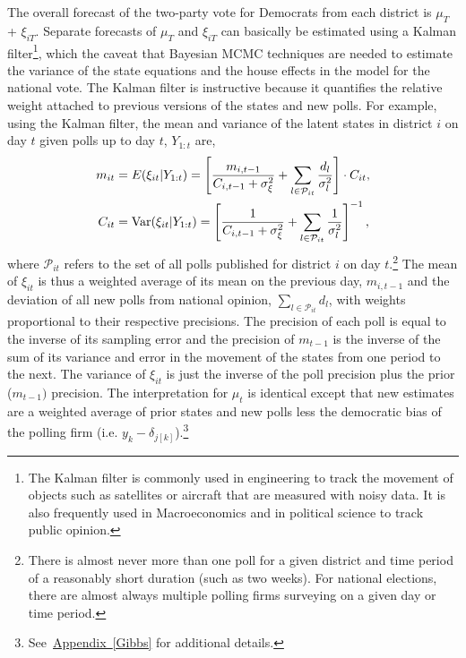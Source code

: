 \documentclass[12pt,final,fleqn]{article}
\newcommand{\aref}[1]{\hyperref[#1]{Appendix~\ref{#1}}}
\theoremstyle{plain}
\newcommand\var{{\rm Var}}
\begin{document}
The overall forecast of the two-party vote for Democrats from each district is $\mu_T$ + $\xi_{iT}$. Separate forecasts of $\mu_T$ and $\xi_{iT}$ can basically be estimated using a Kalman filter\footnote{The Kalman filter is commonly used in engineering to track the movement of objects such as satellites or aircraft that are measured with noisy data. It is also frequently used in Macroeconomics and in political science to track public opinion.}, which the caveat that Bayesian MCMC techniques are needed to estimate the variance of the state equations and the house effects in the model for the national vote. The Kalman filter is instructive because it quantifies the relative weight attached to previous versions of the states and new polls. For example, using the Kalman filter, the mean and variance of the latent states in district $i$ on day $t$ given polls up to day $t$, $Y_{1:t}$ are,
\begin{align}
m_{it} &= E(\xi_{it}|Y_{1:t})= \left[\frac{m_{i,t-1}}{C_{i,t-1} + \sigma_\xi^2} + \sum_{l \in \mathcal{P}_{it}} \frac{d_{l}}{\sigma^2_l}\right]\cdot C_{it},\\
C_{it} &= \var(\xi_{it}|Y_{1:t})= \left[\frac{1}{C_{i,t-1} + \sigma_\xi^2}+ \sum_{l \in \mathcal{P}_{it}}\frac{1}{\sigma^2_{l}}\right]^{-1},
\end{align}
where $\mathcal{P}_{it}$ refers to the set of all polls published for district $i$ on day $t$.\footnote{There is almost never more than one poll for a given district and time period of a reasonably short duration (such as two weeks). For national elections, there are almost always multiple polling firms surveying on a given day or time period.}
The mean of $\xi_{it}$ is thus a weighted average of its mean on the previous day, $m_{i,t-1}$ and the deviation of all new polls from national opinion, $\sum_{l \in \mathcal{P}_{it}} d_{l}$, with weights proportional to their respective precisions. The precision of each poll is equal to the inverse of its sampling error and the precision of $m_{t-1}$ is the inverse of the sum of its variance and error in the movement of the states from one period to the next. The variance of $\xi_{it}$ is just the inverse of the poll precision plus the prior ($m_{t-1})$ precision. The interpretation for $\mu_t$ is identical except that new estimates are a weighted average of prior states and new polls less the democratic bias of the polling firm (i.e. $y_{k} - \delta_{j[k]}$).\footnote{See~\aref{Gibbs} for additional details.}
\end{document}
